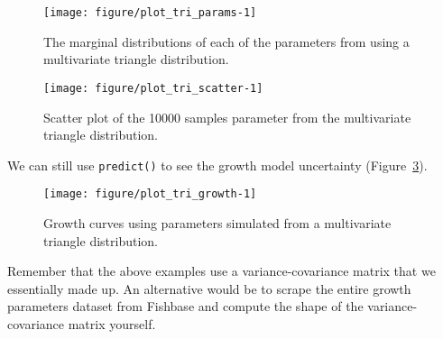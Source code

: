 \documentclass[a4paper,english,10pt]{article}\usepackage[]{graphicx}\usepackage[]{color}
\makeatletter
\def\maxwidth{ %
  \ifdim\Gin@nat@width>\linewidth
    \linewidth
  \else
    \Gin@nat@width
  \fi
}
\newenvironment{knitrout}{}{} %
\newcommand{\code}[1]{{\texttt{#1}}}
\makeatother
\begin{document}
\begin{knitrout}
\color{fgcolor}\begin{figure}[H]

{\centering \texttt{[image: figure/plot\_tri\_params-1]} 

}

\caption[The marginal distributions of each of the parameters from using a multivariate triangle distribution]{The marginal distributions of each of the parameters from using a multivariate triangle distribution.}\label{fig:plot_tri_params}
\end{figure}


\end{knitrout}

\begin{knitrout}
\color{fgcolor}\begin{figure}[H]

{\centering \texttt{[image: figure/plot\_tri\_scatter-1]} 

}

\caption[Scatter plot of the 10000 samples parameter from the multivariate triangle distribution]{Scatter plot of the 10000 samples parameter from the multivariate triangle distribution.}\label{fig:plot_tri_scatter}
\end{figure}


\end{knitrout}

We can still use \code{predict()} to see the growth model uncertainty (Figure~\ref{fig:plot_tri_growth}).

\begin{knitrout}
\color{fgcolor}\begin{figure}[H]

{\centering \texttt{[image: figure/plot\_tri\_growth-1]} 

}

\caption[Growth curves using parameters simulated from a multivariate triangle distribution]{Growth curves using parameters simulated from a multivariate triangle distribution.}\label{fig:plot_tri_growth}
\end{figure}


\end{knitrout}

Remember that the above examples use a variance-covariance matrix that we essentially made up. An alternative would be to scrape the entire growth parameters dataset from Fishbase and compute the shape of the variance-covariance matrix yourself.
\end{document}

